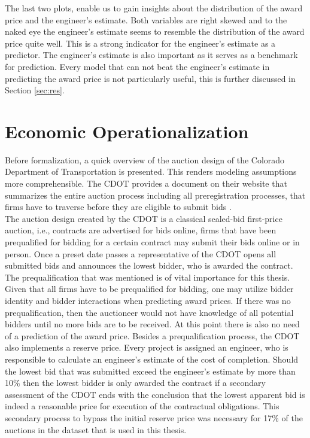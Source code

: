 \documentclass[a4paper,12pt, headsepline]{scrartcl}
\numberwithin{equation}{section}
\begin{document}
The last two plots, enable us to gain insights about the distribution of the award price and the engineer's estimate. Both variables are right skewed and to the naked eye the engineer's estimate seems to resemble the distribution of the award price quite well. This is a strong indicator for the engineer's estimate as a predictor. The engineer's estimate is also important as it serves as a benchmark for prediction. Every model that can not beat the engineer's estimate in predicting the award price is not particularly useful, this is further discussed in Section \ref{sec:res}.\\

\section{Economic Operationalization}\label{sec:op}

Before formalization, a quick overview of the auction design of the Colorado Department of Transportation is presented. This renders modeling assumptions more comprehensible. The CDOT provides a document on their website that summarizes the entire auction process including all preregistration processes, that firms have to traverse before they are eligible to submit bids \citep{CDOTRul}.\\

The auction design created by the CDOT is a classical sealed-bid first-price auction, i.e., contracts are advertised for bids online, firms that have been prequalified for bidding for a certain contract may submit their bids online or in person. Once a preset date passes a representative of the CDOT opens all submitted bids and announces the lowest bidder, who is awarded the contract. The prequalification that was mentioned is of vital importance for this thesis. Given that all firms have to be prequalified for bidding, one may utilize bidder identity and bidder interactions when predicting award prices. If there was no prequalification, then the auctioneer would not have knowledge of all potential bidders until no more bids are to be received. At this point there is also no need of a prediction of the award price. Besides a prequalification process, the CDOT also implements a reserve price. Every project is assigned an engineer, who is responsible to calculate an engineer's estimate of the cost of completion. Should the lowest bid that was submitted exceed the engineer's estimate by more than 10\% then the lowest bidder is only awarded the contract if a secondary assessment of the CDOT ends with the conclusion that the lowest apparent bid is indeed a reasonable price for execution of the contractual obligations. This secondary process to bypass the initial reserve price was necessary for 17\% of the auctions in the dataset that is used in this thesis.
\end{document}
